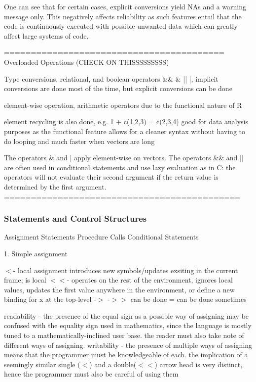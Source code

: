 \documentclass[12pt]{article}
\begin{document}
One can see that for certain cases, explicit conversions yield NAs and a warning message only. This negatively affects reliability as such features entail that the code is continuously executed with possible unwanted data which can greatly affect large systems of code.

=========================================
Overloaded Operations (CHECK ON THISSSSSSSSS)

Type conversions, relational, and boolean operators
 \&\& \& || |, implicit conversions are done most of the time, but explicit conversions can be done

 element-wise operation, arithmetic operators due to the functional nature of R

 element recycling is also done, e.g. 1 + c(1,2,3) = c(2,3,4)
 good for data analysis purposes as the functional feature allows for a cleaner syntax without having to do looping and much faster when vectors are long

 The operators \& and | apply element-wise on vectors. The operators \&\& and || are often used in conditional statements and use lazy evaluation as in C: the operators will not evaluate their second argument if the return value is determined by the first argument.
============================================

\subsubsection{Statements and Control Structures}

Assignment Statements
Procedure Calls
Conditional Statements

1. Simple assignment

\(<\)- local assignment introduces new symbols/updates exsiting in the current frame; is local
\(<<\)- operates on the rest of the environment, ignores local values, updates the first value anywhere in the environment, or define a new binding for x at the top-level
-\(>\) -\(>>\) can be done
= can be done sometimes

readability - the presence of the equal sign as a possible way of assigning may be confused with the equality sign used in mathematics, since the language is mostly tuned to a mathematically-inclined user base. the reader must also take note of different ways of assigning.
writability - the presence of multiple ways of assigning means that the programmer must be knowledgeable of each. the implication of a seemingly similar single (\(<\)) and a double(\(<<\)) arrow head is very distinct, hence the programmer must also be careful of using them
\end{document}

